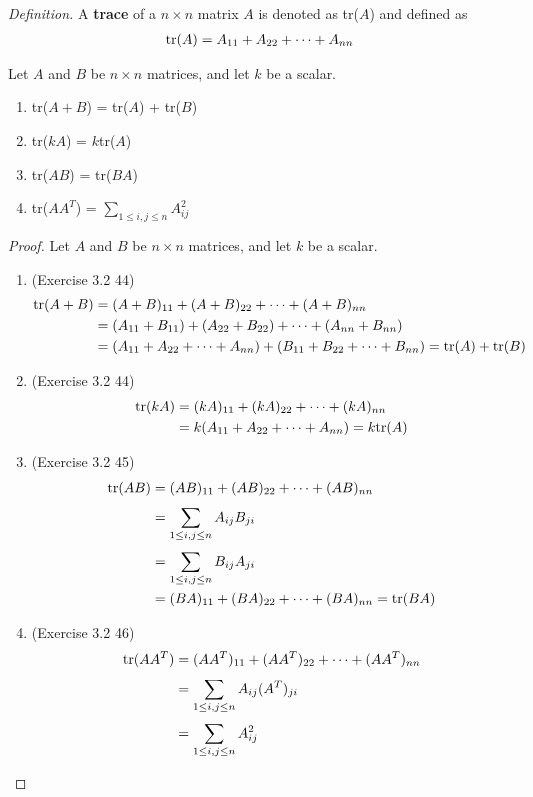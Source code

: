 \noindent \textit{Definition.} A \textbf{trace} of a $n \times n$ matrix $A$ is denoted as tr($A$) and defined as
\begin{align*}
\textnormal{tr}(A) = A_{11} + A_{22} + \cdots + A_{nn}
\end{align*}

\begin{plaintheorem}
	Let $A$ and $B$ be $n \times n$ matrices, and let $k$ be a scalar.
	\begin{enumerate}
		\item tr($A+B$) = tr($A$) + tr($B$)
		\item tr($kA$) = $k$tr($A$)
		\item tr($AB$) = tr($BA$)
		\item tr($AA^T$) = $\sum_{1 \le i, j \le n}^{} A_{ij}^{2}$
	\end{enumerate}
\end{plaintheorem}


\begin{proof}
	Let $A$ and $B$ be $n \times n$ matrices, and let $k$ be a scalar.
	\begin{enumerate}
		\item (Exercise 3.2 44)
		\begin{align*}
		\textnormal{tr}(A+B) &= (A+B)_{11} + (A+B)_{22} + \cdots + (A+B)_{nn} \\
		&= (A_{11} + B_{11}) + (A_{22} + B_{22}) + \cdots + (A_{nn} + B_{nn}) \\
		&= (A_{11} + A_{22} + \cdots + A_{nn}) + (B_{11} + B_{22} + \cdots + B_{nn}) = \textnormal{tr}(A) + \textnormal{tr}(B)
		\end{align*}
		\item (Exercise 3.2 44)
		\begin{align*}
		\textnormal{tr}(kA) &= (kA)_{11} + (kA)_{22} + \cdots + (kA)_{nn} \\
		&= k(A_{11} + A_{22} + \cdots + A_{nn}) = k\textnormal{tr}(A)
		\end{align*}
		\item (Exercise 3.2 45)
		\begin{align*}
		\textnormal{tr}(AB) &= (AB)_{11} + (AB)_{22} + \cdots + (AB)_{nn} \\
		&= \sum_{1 \le i, j \le n}^{} A_{ij}B_{ji} \\
		&= \sum_{1 \le i, j \le n}^{} B_{ij}A_{ji} \\
		&= (BA)_{11} + (BA)_{22} + \cdots + (BA)_{nn} = \textnormal{tr}(BA)
		\end{align*}
		\item (Exercise 3.2 46)
		\begin{align*}
		\textnormal{tr}(AA^T) &= (AA^T)_{11} + (AA^T)_{22} + \cdots + (AA^T)_{nn} \\
		&= \sum_{1 \le i, j \le n}^{} A_{ij}(A^T)_{ji} \\
		&= \sum_{1 \le i, j \le n}^{} A_{ij}^{2}
		\end{align*}
	\end{enumerate}
\end{proof}

